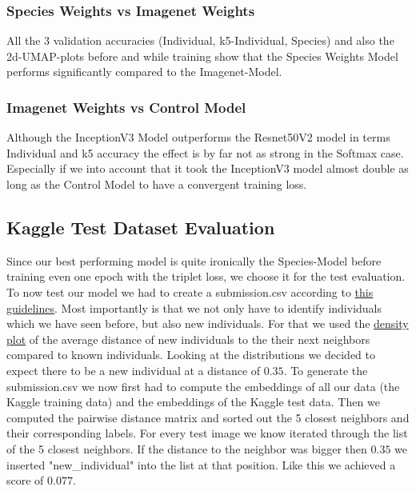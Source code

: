 \subsubsection{Species Weights vs Imagenet Weights}
All the 3 validation accuracies (Individual, k5-Individual, Species) and also the 2d-UMAP-plots before and while training show that the Species Weights Model performs significantly compared to the Imagenet-Model.

\subsubsection{Imagenet Weights vs Control Model}
Although the InceptionV3 Model outperforms the Resnet50V2 model in terms Individual and k5 accuracy the effect is by far not as strong in the Softmax case. Especially if we into account that it took the InceptionV3 model almost double as long as the Control Model to have a convergent training loss. 

\subsection{Kaggle Test Dataset Evaluation}
Since our best performing model is quite ironically the Species-Model before training even one epoch with the triplet loss, we choose it for the test evaluation. 
To now test our model we had to create a submission.csv according to \href{https://www.kaggle.com/competitions/happy-whale-and-dolphin/overview/evaluation}{this guidelines}.
Most importantly is that we not only have to identify individuals which we have seen before, but also new individuals. 
For that we used the \href{https://drive.google.com/uc?id=1syxxE7cTRHr7iRN7vo19Wp3ewCINJxEg}{density plot} of the average distance of new individuals to the their next neighbors compared to known individuals. Looking at the distributions we decided to expect there to be a new individual at a distance of $0.35$. 
To generate the submission.csv we now first had to compute the embeddings of all our data (the Kaggle training data) and the embeddings of the Kaggle test data. Then we computed the pairwise distance matrix and sorted out the 5 closest neighbors and their corresponding labels. For every test image we know iterated through the list of the 5 closest neighbors. If the distance to the neighbor was bigger then $0.35$ we inserted "new\_individual" into the list at that position. Like this we achieved a score of $0.077$.

